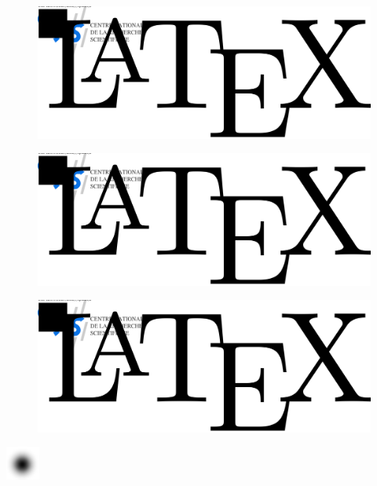 \documentclass[10pt,a4paper]{article}
\begin{document}
\begin{figure}
\includegraphics[subfig=2,scale=0.5]{fig/logo.svg}
\end{figure}
\begin{figure}
\includegraphics[subfig=1,scale=0.5]{fig/logo.svg}
\end{figure}
\begin{figure}
\includegraphics[subfig=3,width=\linewidth]{fig/logo.svg}
\end{figure}

\includegraphics{img.pdf}
\end{document}
